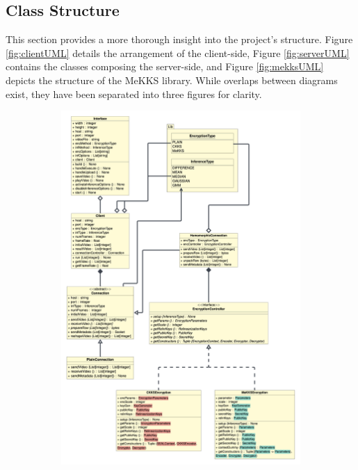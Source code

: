 \subsection{Class Structure}
\indent \indent
This section provides a more thorough insight into the project's structure. Figure \ref{fig:clientUML} details the arrangement of the client-side, Figure \ref{fig:serverUML} contains the classes composing the server-side, and Figure \ref{fig:mekksUML} depicts the structure of the MeKKS library. While overlaps between diagrams exist, they have been separated into three figures for clarity.
\begin{figure}[h!]
    \centering
    \begin{subfigure}[b]{0.44\textwidth}
        \includegraphics[scale=0.13]{figures/clientClasses}
        \captionsetup{justification=centering}

\end{subfigure}
\end{figure}

